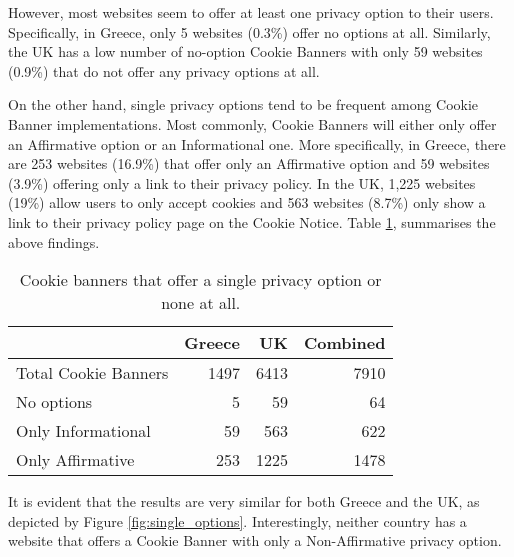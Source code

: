 \documentclass[../main.tex]{subfiles}
\begin{document}
However, most websites seem to offer at least one privacy option to their users. Specifically, in Greece, only 5 websites (0.3\%) offer no options at all. Similarly, the UK has a low number of no-option Cookie Banners with only 59 websites (0.9\%) that do not offer any privacy options at all. 

On the other hand, single privacy options tend to be frequent among Cookie Banner implementations. Most commonly, Cookie Banners will either only offer an Affirmative option or an Informational one. More specifically, in Greece, there are 253 websites (16.9\%) that offer only an Affirmative option and 59 websites (3.9\%) offering only a link to their privacy policy. In the UK, 1,225 websites (19\%) allow users to only accept cookies and 563 websites (8.7\%) only show a link to their privacy policy page on the Cookie Notice. Table \ref{tab:no_options_cookie_banners}, summarises the above findings.

\begin{table}[ht]
    \centering
    \begin{tabular}{@{}lrrr@{}}
        \toprule
                             & Greece & UK   & Combined \\ \midrule
        Total Cookie Banners & 1497   & 6413 & 7910 \\
        No options           & 5      & 59   & 64   \\
        Only Informational   & 59     & 563  & 622  \\ 
        Only Affirmative     & 253    & 1225 & 1478 \\ \bottomrule
    \end{tabular}
    \caption{Cookie banners that offer a single privacy option or none at all.}
    \label{tab:no_options_cookie_banners}
\end{table}

It is evident that the results are very similar for both Greece and the UK, as depicted by Figure \ref{fig:single_options}. Interestingly, neither country has a website that offers a Cookie Banner with only a Non-Affirmative privacy option.

\dps
\end{document}
